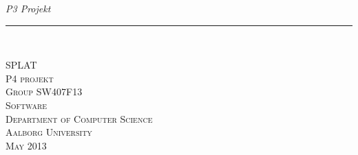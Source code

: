 \thispagestyle{empty}
\begin{flushright}
\vspace{3cm}

\phantom{hul}

\phantom{hul}

\phantom{hul}

\textsl{P3 Projekt} \\ \vspace{1cm}

\rule{0.8\textwidth}{3mm} \\ \vspace{1.5cm}
\vspace{1cm}


\vspace{2cm} 
\textsc{\Large SPLAT \\
P4 projekt\\
Group SW407F13\\
Software\\
Department of Computer Science\\
Aalborg University\\
May 2013\\
}
\end{flushright}
